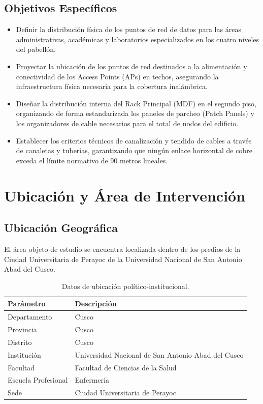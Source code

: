\subsection{Objetivos Específicos}
\begin{itemize}[label=$\bullet$,leftmargin=1.4em]
    \item Definir la distribución física de los puntos de red de datos para las áreas administrativas, académicas y laboratorios especializados en los cuatro niveles del pabellón.
    \item Proyectar la ubicación de los puntos de red destinados a la alimentación y conectividad de los Access Points (APs) en techos, asegurando la infraestructura física necesaria para la cobertura inalámbrica.
    \item Diseñar la distribución interna del Rack Principal (MDF) en el segundo piso, organizando de forma estandarizada los paneles de parcheo (Patch Panels) y los organizadores de cable necesarios para el total de nodos del edificio.
    \item Establecer los criterios técnicos de canalización y tendido de cables a través de canaletas y tuberías, garantizando que ningún enlace horizontal de cobre exceda el límite normativo de 90 metros lineales.
\end{itemize}

\section{Ubicación y Área de Intervención}

\subsection{Ubicación Geográfica}
El área objeto de estudio se encuentra localizada dentro de los predios de la Ciudad Universitaria de Perayoc de la Universidad Nacional de San Antonio Abad del Cusco.

\begin{table}[H]
\centering
\caption{Datos de ubicación político-institucional.}
\begin{tabular}{ll}
\hline
\textbf{Parámetro} & \textbf{Descripción} \\
\hline
Departamento & Cusco \\
Provincia & Cusco \\
Distrito & Cusco \\
Institución & Universidad Nacional de San Antonio Abad del Cusco \\
Facultad & Facultad de Ciencias de la Salud \\
Escuela Profesional & Enfermería \\
Sede & Ciudad Universitaria de Perayoc \\
\hline
\end{tabular}
\end{table}

